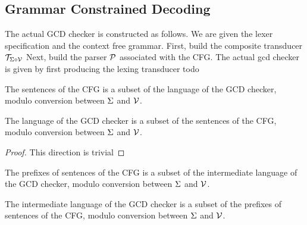 
\subsection{Grammar Constrained Decoding}
\begin{definition}[GCDChecker]
    \label{def:GCDChecker}
    The actual GCD checker is constructed as follows. We are given the lexer specification and the context free grammar.
    First, build the composite transducer $\mathcal{T}_{\Sigma \circ \mathcal{V}}$
    Next, build the parser $\mathcal{P}$ associated with the CFG.
    The actual gcd checker is given by first producing the lexing transducer
    todo
\end{definition}

\begin{theorem} 

\end{theorem}

\begin{theorem}
    \label{thm:GrammarSubsetCheckerLang}
    The sentences of the CFG is a subset of the language of the GCD checker, modulo conversion between $\Sigma$ and $\mathcal{V}$.
\end{theorem}

\begin{theorem}
    \label{thm:CheckerLangSubsetGrammar}
    The language of the GCD checker is a subset of the sentences of the CFG, modulo conversion between $\Sigma$ and $\mathcal{V}$.
\end{theorem}
\begin{proof}
    This direction is trivial 
\end{proof}

\begin{theorem}
    \label{thm:PrefixSubsetIntermediate} 
    The prefixes of sentences of the CFG is a subset of the intermediate language of the GCD checker, modulo conversion between $\Sigma$ and $\mathcal{V}$.
\end{theorem}

\begin{theorem}
    \label{thm:IntermediateSubsetPrefix} 
    The intermediate language of the GCD checker is a subset of the prefixes of sentences of the CFG, modulo conversion between $\Sigma$ and $\mathcal{V}$.
\end{theorem}

